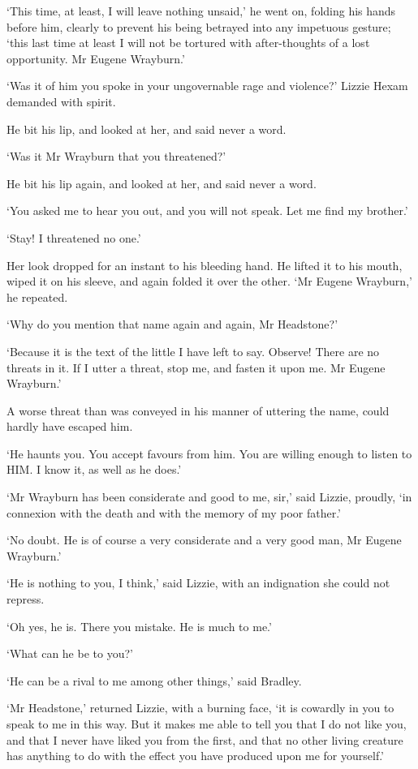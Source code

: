 ‘This time, at least, I will leave nothing unsaid,’ he went on, folding
his hands before him, clearly to prevent his being betrayed into any
impetuous gesture; ‘this last time at least I will not be tortured with
after-thoughts of a lost opportunity. Mr Eugene Wrayburn.’

‘Was it of him you spoke in your ungovernable rage and violence?’ Lizzie
Hexam demanded with spirit.

He bit his lip, and looked at her, and said never a word.

‘Was it Mr Wrayburn that you threatened?’

He bit his lip again, and looked at her, and said never a word.

‘You asked me to hear you out, and you will not speak. Let me find my
brother.’

‘Stay! I threatened no one.’

Her look dropped for an instant to his bleeding hand. He lifted it to
his mouth, wiped it on his sleeve, and again folded it over the other.
‘Mr Eugene Wrayburn,’ he repeated.

‘Why do you mention that name again and again, Mr Headstone?’

‘Because it is the text of the little I have left to say. Observe! There
are no threats in it. If I utter a threat, stop me, and fasten it upon
me. Mr Eugene Wrayburn.’

A worse threat than was conveyed in his manner of uttering the name,
could hardly have escaped him.

‘He haunts you. You accept favours from him. You are willing enough to
listen to HIM. I know it, as well as he does.’

‘Mr Wrayburn has been considerate and good to me, sir,’ said Lizzie,
proudly, ‘in connexion with the death and with the memory of my poor
father.’

‘No doubt. He is of course a very considerate and a very good man, Mr
Eugene Wrayburn.’

‘He is nothing to you, I think,’ said Lizzie, with an indignation she
could not repress.

‘Oh yes, he is. There you mistake. He is much to me.’

‘What can he be to you?’

‘He can be a rival to me among other things,’ said Bradley.

‘Mr Headstone,’ returned Lizzie, with a burning face, ‘it is cowardly in
you to speak to me in this way. But it makes me able to tell you that
I do not like you, and that I never have liked you from the first, and
that no other living creature has anything to do with the effect you
have produced upon me for yourself.’

